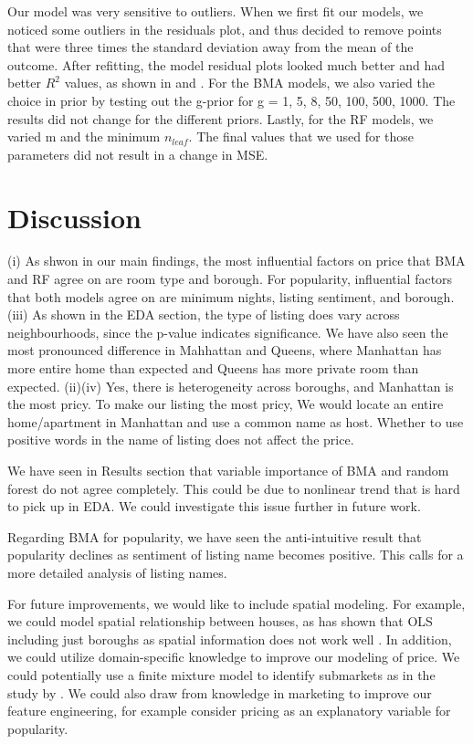 \documentclass[10pt]{jmlr}%
\begin{document}
Our model was very sensitive to outliers. When we first fit our models, we noticed some outliers in the residuals plot, and thus decided to remove points that were three times the standard deviation away from the mean of the outcome. After refitting, the model residual plots looked much better and had better $R^2$ values, as shown in  and . For the BMA models, we also varied the choice in prior by testing out the g-prior for g = 1, 5, 8, 50, 100, 500, 1000. The results did not change for the different priors. Lastly, for the RF models, we varied m and the minimum $n_{leaf}$. The final values that we used for those parameters did not result in a change in MSE. 

\section{Discussion}
\label{sec:conclusion}

(i) As shwon in our main findings, the most influential factors on price that BMA and RF agree on are room type and borough. For popularity, influential factors that both models agree on are minimum nights, listing sentiment, and borough. (iii) As shown in the EDA section, the type of listing does vary across neighbourhoods, since the p-value indicates significance. We have also seen the most pronounced difference in Mahhattan and Queens, where Manhattan has more entire home than expected and Queens has more private room than expected. (ii)(iv) Yes, there is heterogeneity across boroughs, and Manhattan is the most pricy. To make our listing the most pricy, We would locate an entire home/apartment in Manhattan and use a common name as host. Whether to use positive words in the name of listing does not affect the price.

We have seen in Results section that variable importance of BMA and random forest do not agree completely. This could be due to nonlinear trend that is hard to pick up in EDA. We could investigate this issue further in future work.

Regarding BMA for popularity, we have seen the anti-intuitive result that popularity declines as sentiment of listing name becomes positive. This calls for a more detailed analysis of listing names.

For future improvements, we would like to include spatial modeling. For example, we could model spatial relationship between houses, as \cite{james2005apartment} has shown that OLS including just boroughs as spatial information does not work well . In addition, we could utilize domain-specific knowledge to improve our modeling of price. We could potentially use a finite mixture model to identify submarkets as in the study by \cite{belasco2012using}. We could also draw from knowledge in marketing to improve our feature engineering, for example consider pricing as an explanatory variable for popularity.
\end{document}
